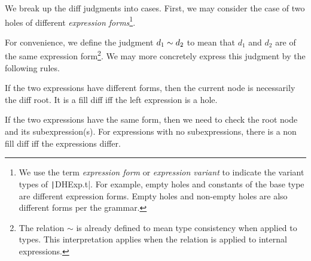 We break up the diff judgments into cases. First, we may consider the case of two holes of different \textit{expression forms}\footnote{We use the term \textit{expression form} or \textit{expression variant} to indicate the variant types of \texttt|DHExp.t|. For example, empty holes and constants of the base type are different expression forms. Empty holes and non-empty holes are also different forms per the grammar.}.

For convenience, we define the judgment $d_1\sim d_2$ to mean that $d_1$ and $d_2$ are of the same expression form\footnote{The relation $\sim$ is already defined to mean type consistency when applied to types. This interpretation applies when the relation is applied to internal expressions.}. We may more concretely express this judgment by the following rules.

\begin{singlespace}
\end{singlespace}

If the two expressions have different forms, then the current node is necessarily the diff root. It is a fill diff iff the left expression is a hole.

\begin{singlespace}
\end{singlespace}

If the two expressions have the same form, then we need to check the root node and its subexpression(s). For expressions with no subexpressions, there is a non fill diff iff the expressions differ.

